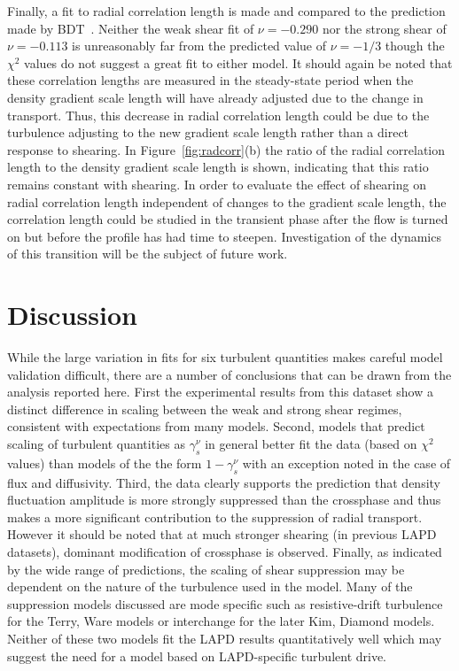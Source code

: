 \documentclass[aip,pop,amsmath,amssymb,reprint,superscriptaddress]{revtex4-1} %
\begin{document}
Finally, a fit to radial correlation length is made and compared to the prediction made by BDT~\cite{biglari90}. Neither the weak shear fit of $\nu = -0.290$ nor the strong shear of $\nu = -0.113$ is unreasonably far from the predicted value of $\nu = -1/3$ though the $\chi^{2}$ values do not suggest a great fit to either model.  It should again be noted that these correlation lengths are measured in the steady-state period when the density gradient scale length will have already adjusted due to the change in transport. Thus, this decrease in radial correlation length could be due to the turbulence adjusting to the new gradient scale length rather than a direct response to shearing.  In Figure~\ref{fig:radcorr}(b) the ratio of the radial correlation length to the density gradient scale length is shown, indicating that this ratio remains constant with shearing. In order to evaluate the effect of shearing on radial correlation length independent of changes to the gradient scale length, the correlation length could be studied in the transient phase after the flow is turned on but before the profile has had time to steepen.   Investigation of the dynamics of this transition will be the subject of future work. 

\section{Discussion}

While the large variation in fits for six turbulent quantities makes careful model validation difficult, there are a number of conclusions that can be drawn from the analysis reported here. First the experimental results from this dataset show a distinct difference in scaling between the weak and strong shear regimes, consistent with expectations from many models. Second, models that predict scaling of turbulent quantities as $\gamma_{s}^{\nu}$ in general better fit the data (based on $\chi^{2}$ values) than models of the the form $1-\gamma_{s}^{\nu}$ with an exception noted in the case of flux and diffusivity. Third, the data clearly supports the prediction that density fluctuation amplitude is more strongly suppressed than the crossphase and thus makes a more significant contribution to the suppression of radial transport.  However it should be noted that at much stronger shearing (in previous LAPD datasets), dominant modification of crossphase is observed.  Finally, as indicated by the wide range of predictions, the scaling of shear suppression may be dependent on the nature of the turbulence used in the model. Many of the suppression models discussed are mode specific such as resistive-drift turbulence for the Terry, Ware models or interchange for the later Kim, Diamond models. Neither of these two models fit the LAPD results quantitatively well which  may suggest the need for a model based on LAPD-specific turbulent drive.
\end{document}
